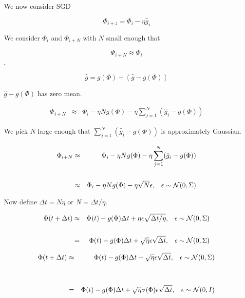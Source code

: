 {

\vfill
We now consider SGD

$$\Phi_{i+1} = \Phi_i - \eta\hat{g}_i$$

\vfill
We consider $\Phi_i$ and $\Phi_{i+N}$ with $N$ small enough that

$$\Phi_{i+N} \approx \Phi_i$$.


$$\hat{g} = g(\Phi) + (\hat{g} - g(\Phi))$$

\vfill
$\hat{g} - g(\Phi)$ has zero mean.

\begin{eqnarray*}
\Phi_{i+N} & \approx & \Phi_i - \eta N g(\Phi)  - \eta \sum_{j=1}^N (\hat{g}_i - g(\Phi))
\end{eqnarray*}

\vfill
We pick $N$ large enough that $\sum_{j=1}^N (\hat{g}_i - g(\Phi))$ is approximately Gaussian.


\begin{eqnarray*}
\Phi_{i+N} & \approx & \Phi_i - \eta N g(\Phi)  - \eta \sum_{j=1}^N (\hat{g}_i - g(\Phi)) \\
\\
& \approx & \Phi_i - \eta N g(\Phi)  - \eta \sqrt{N} \epsilon,\;\;\; \epsilon \sim {\cal N}(0,\Sigma)
\end{eqnarray*}

\vfill
Now define $\Delta t = N\eta$ or $N = \Delta t/\eta$.

\begin{eqnarray*}
\Phi(t+ \Delta t) & \approx & \Phi(t) - g(\Phi)\Delta t +  \eta\epsilon \sqrt{ \Delta t/\eta},\;\;\; \epsilon \sim {\cal N}(0,\Sigma) \\
\\
& = & \Phi(t) - g(\Phi)\Delta t +  \sqrt{\eta}\epsilon \sqrt{\Delta t},\;\;\; \epsilon \sim {\cal N}(0,\Sigma)
\end{eqnarray*}



\begin{eqnarray*}
\Phi(t+ \Delta t) & \approx & \Phi(t) - g(\Phi)\Delta t +  \sqrt{\eta}\epsilon \sqrt{ \Delta t},\;\;\; \epsilon \sim {\cal N}(0,\Sigma) \\
\\
\\
& = & \Phi(t) - g(\Phi)\Delta t +  \sqrt{\eta}\sigma(\Phi) \epsilon \sqrt{ \Delta t},\;\;\; \epsilon \sim {\cal N}(0,I) 
\end{eqnarray*}

}
